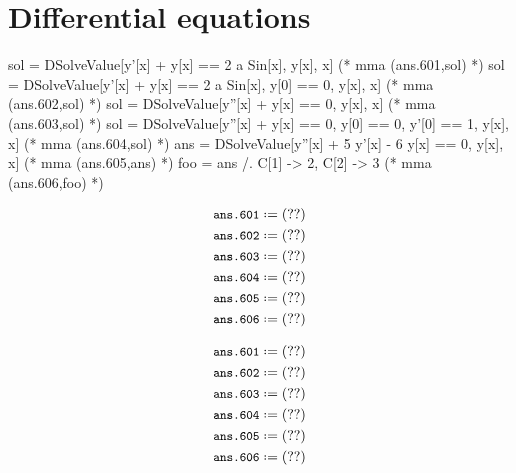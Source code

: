 \documentclass[12pt]{mmalatex}
\begin{document}
\clearpage

\section*{Differential equations}

\begin{minipage}[t]{0.78\textwidth}
\begin{mathematica}
   sol = DSolveValue[y'[x] + y[x] == 2 a Sin[x], y[x], x]                  (* mma (ans.601,sol) *)
   sol = DSolveValue[{y'[x] + y[x] == 2 a Sin[x], y[0] == 0}, y[x], x]     (* mma (ans.602,sol) *)
   sol = DSolveValue[{y''[x] + y[x] == 0}, y[x], x]                        (* mma (ans.603,sol) *)
   sol = DSolveValue[{y''[x] + y[x] == 0, y[0] == 0, y'[0] == 1}, y[x], x] (* mma (ans.604,sol) *)
   ans = DSolveValue[y''[x] + 5 y'[x] - 6 y[x] == 0, y[x], x]              (* mma (ans.605,ans) *)
   foo = ans /. {C[1] -> 2, C[2] -> 3}                                     (* mma (ans.606,foo) *)
\end{mathematica}
\end{minipage}
\hskip 0.5cm
\begin{minipage}[t]{0.22\textwidth}
\begin{latex}
   \begin{align*}
      &\mma*{ans.601}\\
      &\mma*{ans.602}\\
      &\mma*{ans.603}\\
      &\mma*{ans.604}\\
      &\mma*{ans.605}\\
      &\mma*{ans.606}
   \end{align*}
\end{latex}
\end{minipage}

\begin{align*}
   &\mma*{ans.601}\\
   &\mma*{ans.602}\\
   &\mma*{ans.603}\\
   &\mma*{ans.604}\\
   &\mma*{ans.605}\\
   &\mma*{ans.606}
\end{align*}
\end{document}
